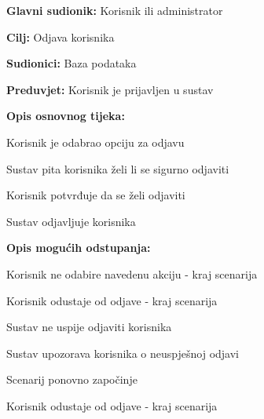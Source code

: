 					\noindent {}
					\begin{packed_item}
	
						\item \textbf{Glavni sudionik: }Korisnik ili administrator
						\item  \textbf{Cilj:} Odjava korisnika
						\item  \textbf{Sudionici:} Baza podataka
						\item  \textbf{Preduvjet:} Korisnik je prijavljen u sustav
						\item  \textbf{Opis osnovnog tijeka:}
						
						\item[] \begin{packed_enum}
							\item Korisnik je odabrao opciju za odjavu
							\item Sustav pita korisnika želi li se sigurno odjaviti
							\item Korisnik potvrđuje da se želi odjaviti
							\item Sustav odjavljuje korisnika
						\end{packed_enum}

						\eject

						\item  \textbf{Opis mogućih odstupanja:}

						\item[] \begin{packed_item}
							\item[1.a] Korisnik ne odabire navedenu akciju - kraj scenarija
							\item[3.a] Korisnik odustaje od odjave - kraj scenarija
							\item[4.a] Sustav ne uspije odjaviti korisnika
							\item[] \begin{packed_enum}
								\item Sustav upozorava korisnika o neuspješnoj odjavi 
								\item
									\begin{packed_enum}
										\item Scenarij ponovno započinje
										\item Korisnik odustaje od odjave - kraj scenarija
									\end{packed_enum}
							\end{packed_enum}						
						\end{packed_item}
					\end{packed_item}

